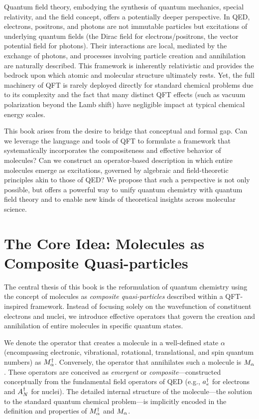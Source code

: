 Quantum field theory, embodying the synthesis of quantum mechanics, special relativity, and the field concept, offers a potentially deeper perspective. In QED, electrons, positrons, and photons are not immutable particles but excitations of underlying quantum fields (the Dirac field for electrons/positrons, the vector potential field for photons). Their interactions are local, mediated by the exchange of photons, and processes involving particle creation and annihilation are naturally described. This framework is inherently relativistic and provides the bedrock upon which atomic and molecular structure ultimately rests. Yet, the full machinery of QFT is rarely deployed directly for standard chemical problems due to its complexity and the fact that many distinct QFT effects (such as vacuum polarization beyond the Lamb shift) have negligible impact at typical chemical energy scales.

This book arises from the desire to bridge that conceptual and formal gap. Can we leverage the language and tools of QFT to formulate a framework that systematically incorporates the compositeness and effective behavior of molecules? Can we construct an operator-based description in which entire molecules emerge as excitations, governed by algebraic and field-theoretic principles akin to those of QED? We propose that such a perspective is not only possible, but offers a powerful way to unify quantum chemistry with quantum field theory and to enable new kinds of theoretical insights across molecular science.

\section{The Core Idea: Molecules as Composite Quasi-particles}
\label{sec:intro_core_idea}

The central thesis of this book is the reformulation of quantum chemistry using the concept of molecules as \emph{composite quasi-particles} described within a QFT-inspired framework. Instead of focusing solely on the wavefunction of constituent electrons and nuclei, we introduce effective operators that govern the creation and annihilation of entire molecules in specific quantum states.

We denote the operator that creates a molecule in a well-defined state \(\alpha\) (encompassing electronic, vibrational, rotational, translational, and spin quantum numbers) as \(M^\dagger_{\alpha}\). Conversely, the operator that annihilates such a molecule is \(M_{\alpha}\). These operators are conceived as \emph{emergent} or \emph{composite}—constructed conceptually from the fundamental field operators of QED (e.g., \(a^\dagger_{e}\) for electrons and \(A^\dagger_{N}\) for nuclei). The detailed internal structure of the molecule—the solution to the standard quantum chemical problem—is implicitly encoded in the definition and properties of \(M^\dagger_{\alpha}\) and \(M_{\alpha}\).

